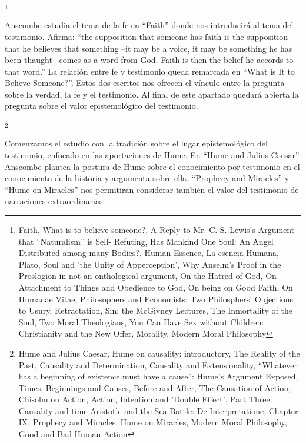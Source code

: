 \documentclass[11pt]{article}
\begin{document}
{\begin{spacing}{1.5}
\footnote{
Faith, 
What is to believe someone?, 
A Reply to Mr. C. S. Lewis's Argument that “Naturalism” is Self- Refuting, 
Has Mankind One Soul: An Angel Distributed among many Bodies?, 
Human Essence, 
La esencia Humana, 
Plato, Soul and 'the Unity of Apperception', 
Why Anselm's Proof in the Proslogion in not an onthological argument, 
On the Hatred of God, 
On Attachment to Things and Obedience to God, 
On being on Good Faith, 
On Humanae Vitae, 
Philosophers and Economists: Two Philosphers' Objections to Usury, 
Retractation, 
Sin: the McGivney Lectures, 
The Inmortality of the Soul, 
Two Moral Theologians, 
You Can Have Sex without Children: Christianity and the New Offer, 
Morality, 
Modern Moral Philosophy
}

\begin{spacing}{1}
Anscombe estudia el tema de la fe en ``Faith'' donde nos introducirá al tema del testimonio. Afirma: ``the supposition that someone has faith is the supposition that he believes that something --it may be a voice, it may be something he has been thaught-- comes as a word from God. Faith is then the belief he accords to that word.'' La relación entre fe y testimonio queda remarcada en ``What is It to Believe Someone?''. Estos dos escritos nos ofrecen el vínculo entre la pregunta sobre la verdad, la fe y el testimonio. Al final de este apartado quedará abierta la pregunta sobre el valor epistemológico del testimonio.
\end{spacing}

\footnote{
Hume and Julius Caesar, 
Hume on causality: introductory, 
The Reality of the Past, 
Causality and Determination, 
Causality and Extensionality, 
“Whatever has a beginning of existence must have a cause”: Hume's Argument Exposed, 
Times, Beginnings and Causes, 
Before and After, 
The Causation of Action, 
Chisolm on Action, 
Action, Intention and 'Double Effect', 
Part Three: Causality and time
Aristotle and the Sea Battle: De Interpretatione, Chapter IX, 
Prophecy and Miracles, 
Hume on Miracles, 
Modern Moral Philosophy, 
Good and Bad Human Action
}

\begin{spacing}{1}
Comenzamos el estudio con la tradición sobre el lugar epistemológico del testimonio, enfocado en las aportaciones de Hume. En ``Hume and Julius Caesar'' Anscombe plantea la postura de Hume sobre el conocimiento por testimonio en el conocimiento de la historia y argumenta sobre ella. ``Prophecy and Miracles'' y ``Hume on Miracles'' nos permitiran considerar también el valor del testimonio de narraciones extraordinarias. 
\end{spacing}


\end{spacing}}
\end{document}
